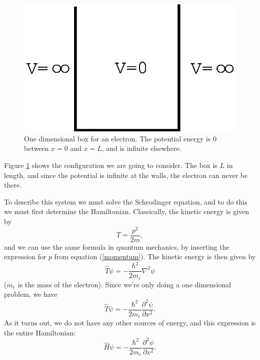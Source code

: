 \begin{figure}
\begin{center}
\includegraphics[scale=0.5]{pbox2.eps}
\caption{One dimensional box for an electron. The potential energy is
0 between $x=0$ and $x=L$, and is infinite elsewhere.}
\label{fig-1d-box}
\end{center}
\end{figure}

Figure \ref{fig-1d-box} shows the configuration we are going to
consider. The box is $L$ in length, and since the potential is
infinite at the walls, the electron can never be there. 

To describe this system we must solve the Schrodinger equation, and to
do this we must first determine the Hamiltonian. Classically, the
kinetic energy is given by
\begin{equation}
	T=\frac{p^2}{2m},
\end{equation}
and we can use the same formula in quantum mechanics, by
inserting the expression for $p$ from equation (\ref{momentum}). The 
kinetic energy is then given by
\begin{equation}
	\hat{T}\psi=-\frac{\hbar^2}{2m_e}\nabla^2\psi
\end{equation}
($m_e$ is the mass of the electron). Since we're only doing a one
dimensional problem, we have
\begin{equation}
	\hat{T}\psi=-\frac{\hbar^2}{2m_e}\frac{\partial^2\psi}
		{\partial x^2}.
\end{equation}
As it turns out, we do not have any other sources of energy,
and this expression is the entire Hamiltonian: 
\begin{equation}
	\hat{H}\psi=-\frac{\hbar^2}{2m_e}\frac{\partial^2\psi}
		{\partial x^2}.
\label{pbox_ham}
\end{equation}

